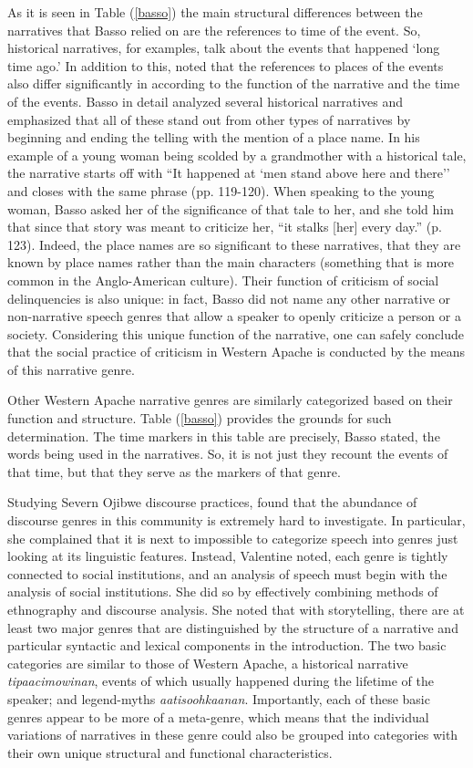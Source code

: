 \documentclass[12pt, draft]{article}
\begin{document}
As it is seen in Table (\ref{basso}) the main structural differences between the narratives that Basso relied on are the references to time of the event. So, historical narratives, for examples, talk about the events that happened `long time ago.' In addition to this, \textcite{basso1990} noted that the references to places of the events also differ significantly in according to the function of the narrative and the time of the events. Basso in detail analyzed several historical narratives and emphasized that all of these stand out from other types of narratives by beginning and ending the telling with the mention of a place name. In his example of a young woman being scolded by a grandmother with a historical tale, the narrative starts off with ``It happened at `men stand above here and there'' and closes with the same phrase (pp. 119-120). When speaking to the young woman, Basso asked her of the significance of that tale to her, and she told him that since that story was meant to criticize her, ``it stalks [her] every day.'' (p. 123). Indeed, the place names are so significant to these narratives, that they are known by place names rather than the main characters (something that is more common in the Anglo-American culture). Their function of criticism of social delinquencies is also unique: in fact, Basso did not name any other narrative or non-narrative speech genres that allow a speaker to openly criticize a person or a society. Considering this unique function of the narrative, one can safely conclude that the social practice of criticism in Western Apache is conducted by the means of this narrative genre.

Other Western Apache narrative genres are similarly categorized based on their function and structure. Table (\ref{basso}) provides the grounds for such determination. The time markers in this table are precisely, Basso stated, the words being used in the narratives. So, it is not just they recount the events of that time, but that they serve as the markers of that genre. 

Studying Severn Ojibwe discourse practices, \textcite{valentine1995} found that the abundance of discourse genres in this community is extremely hard to investigate. In particular, she complained that it is next to impossible to categorize speech into genres just looking at its linguistic features. Instead, Valentine noted, each genre is tightly connected to  social institutions, and an analysis of speech must begin with the analysis of social institutions. She did so by effectively combining methods of ethnography and discourse analysis. She noted that with storytelling, there are at least two major genres that are distinguished by the structure of a narrative and particular syntactic and lexical components in the introduction. The two basic categories are similar to those of Western Apache, a historical narrative \textit{tipaacimowinan}, events of which usually happened during the lifetime of the speaker; and legend-myths \textit{aatisoohkaanan}. Importantly, each of these basic genres appear to be more of a meta-genre, which means that the individual variations of narratives in these genre could also be grouped into categories with their own unique structural and functional characteristics.
\end{document}
